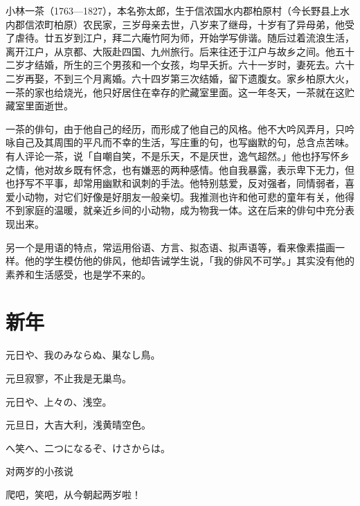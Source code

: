 {\FS
    小林一茶（1763—1827），本名弥太郎，生于信浓国水内郡柏原村（今长野县上水内郡信浓町柏原）农民家，三岁母亲去世，八岁来了继母，十岁有了异母弟，他受了虐待。廿五岁到江户，拜二六庵竹阿为师，开始学写俳谐。随后过着流浪生活，离开江户，从京都、大阪赴四国、九州旅行。后来往还于江户与故乡之间。他五十二岁才结婚，所生的三个男孩和一个女孩，均早夭折。六十一岁时，妻死去。六十二岁再娶，不到三个月离婚。六十四岁第三次结婚，留下遗腹女。家乡柏原大火，一茶的家也给烧光，他只好居住在幸存的贮藏室里面。这一年冬天，一茶就在这贮藏室里面逝世。

    一茶的俳句，由于他自己的经历，而形成了他自己的风格。他不大吟风弄月，只吟咏自己及其周围的平凡而不幸的生活，写庄重的句，也写幽默的句，总含点苦味。有人评论一茶，说「自嘲自笑，不是乐天，不是厌世，逸气超然。」他也抒写怀乡之情，他对故乡既有怀念，也有嫌恶的两种感情。他自我暴露，表示卑下无力，但也抒写不平事，却常用幽默和讽刺的手法。他特别慈爱，反对强者，同情弱者，喜爱小动物，对它们好像是好朋友一般亲切。我推测也许和他可悲的童年有关，他得不到家庭的温暖，就亲近乡间的小动物，成为物我一体。这在后来的俳句中充分表现出来。

    另一个是用语的特点，常运用俗语、方言、拟态语、拟声语等，看来像素描画一样。他的学生模仿他的俳风，他却告诫学生说，「我的俳风不可学。」其实没有他的素养和生活感受，也是学不来的。
}

\newpage

\section{\FK 新年}

\setcounter{haikucounter}{0}

\begin{haiku}
    {\FH 元日や、我のみならぬ、巣なし鳥。}

    {\FK 元旦寂寥，不止我是无巢鸟。}
\end{haiku}

\begin{haiku}
    {\FH 元日や、上々の、浅空。}

    {\FK 元旦日，大吉大利，浅黄晴空色。}
\end{haiku}

\begin{haiku}
    {\FH {}へ笑へ、二つになるぞ、けさからは。}

    {\FK 对两岁的小孩说}

    {\FK 爬吧，笑吧，从今朝起两岁啦！}
\end{haiku}

